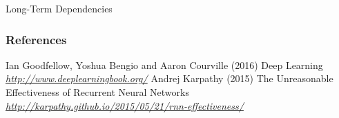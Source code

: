 \begin{vbframe}{Long-Term Dependencies}
\begin{itemize}
  \end{itemize}


\end{vbframe}
\begin{vbframe}
\frametitle{References}
\footnotesize{
\begin{thebibliography}{99}
 Ian Goodfellow, Yoshua Bengio and Aaron Courville (2016)
\newblock Deep Learning
\newblock \emph{\url{http://www.deeplearningbook.org/}}
 Andrej Karpathy (2015)
\newblock The Unreasonable Effectiveness of Recurrent Neural Networks
\newblock \emph{\url{http://karpathy.github.io/2015/05/21/rnn-effectiveness/}}
\end{thebibliography}
}
\end{vbframe}

\endlecture
